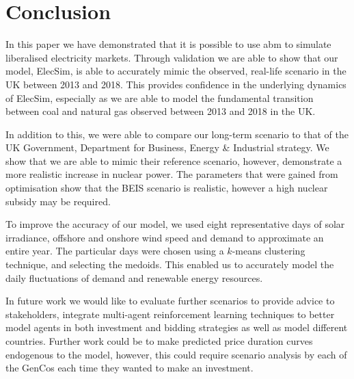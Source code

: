 






\section{Conclusion}
\label{sec:conclusion}

In this paper we have demonstrated that it is possible to use \acrshort{abm} to simulate liberalised electricity markets. Through validation we are able to show that our model, ElecSim, is able to accurately mimic the observed, real-life scenario in the UK between 2013 and 2018. This provides confidence in the underlying dynamics of ElecSim, especially as we are able to model the fundamental transition between coal and natural gas observed between 2013 and 2018 in the UK.

In addition to this, we were able to compare our long-term scenario to that of the UK Government, Department for Business, Energy \& Industrial strategy. We show that we are able to mimic their reference scenario, however, demonstrate a more realistic increase in nuclear power. The parameters that were gained from optimisation show that the BEIS scenario is realistic, however a high nuclear subsidy may be required.

To improve the accuracy of our model, we used eight representative days of solar irradiance, offshore and onshore wind speed and demand to approximate an entire year. The particular days were chosen using a $k$-means clustering technique, and selecting the medoids. This enabled us to accurately model the daily fluctuations of demand and renewable energy resources. 


In future work we would like to evaluate further scenarios to provide advice to stakeholders, integrate multi-agent reinforcement learning techniques to better model agents in both investment and bidding strategies as well as model different countries. Further work could be to make predicted price duration curves endogenous to the model, however, this could require scenario analysis by each of the GenCos each time they wanted to make an investment.

